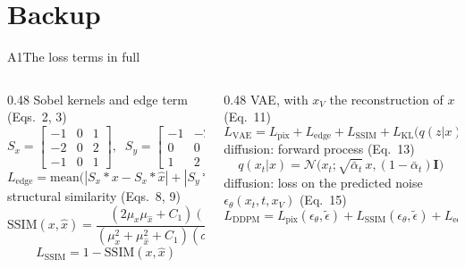 \section[Backup]{Backup}

\begin{frame}[source={Liao et al.\ (2026), Nat.\ Commun.\ 17, 11232, Eqs.\ 2--15}]{A1\enspace The loss terms in full}
  \begin{columns}[T,onlytextwidth]
    \begin{column}{0.48\textwidth}
      \small
      {\scriptsize\color{udsgrey}Sobel kernels and edge term (Eqs.\ 2, 3)}
      \[ S_x=\left[\begin{array}{rrr}-1&0&1\\-2&0&2\\-1&0&1\end{array}\right],\;\;
         S_y=\left[\begin{array}{rrr}-1&-2&-1\\0&0&0\\1&2&1\end{array}\right] \]
      \[ L_{\mathrm{edge}}=\mathrm{mean}\big(|S_x\ast x-S_x\ast\hat{x}|+|S_y\ast x-S_y\ast\hat{x}|\big) \]
      {\scriptsize\color{udsgrey}structural similarity (Eqs.\ 8, 9)}
      \[ \mathrm{SSIM}(x,\hat{x})=\frac{(2\mu_x\mu_{\hat{x}}+C_1)(2\sigma_{x\hat{x}}+C_2)}
         {(\mu_x^2+\mu_{\hat{x}}^2+C_1)(\sigma_x^2+\sigma_{\hat{x}}^2+C_2)} \]
      \[ L_{\mathrm{SSIM}}=1-\mathrm{SSIM}(x,\hat{x}) \]
    \end{column}
    \begin{column}{0.48\textwidth}
      \small
      {\scriptsize\color{udsgrey}VAE, with $x_V$ the reconstruction of $x$ (Eq.\ 11)}
      \[ L_{\mathrm{VAE}}=L_{\mathrm{pix}}+L_{\mathrm{edge}}+L_{\mathrm{SSIM}}+L_{\mathrm{KL}}\big(q(z|x),p(z)\big) \]
      {\scriptsize\color{udsgrey}diffusion: forward process (Eq.\ 13)}
      \[ q(x_t|x)=\mathcal{N}\big(x_t;\sqrt{\bar{\alpha}_t}\,x,(1-\bar{\alpha}_t)\mathbf{I}\big) \]
      {\scriptsize\color{udsgrey}diffusion: loss on the predicted noise $\epsilon_\theta(x_t,t,x_V)$ (Eq.\ 15)}
      \[ L_{\mathrm{DDPM}}=L_{\mathrm{pix}}(\epsilon_\theta,\tilde{\epsilon})+L_{\mathrm{SSIM}}(\epsilon_\theta,\tilde{\epsilon})
         +L_{\mathrm{edge}}(\epsilon_\theta,\tilde{\epsilon}) \]
    \end{column}
  \end{columns}
\end{frame}

